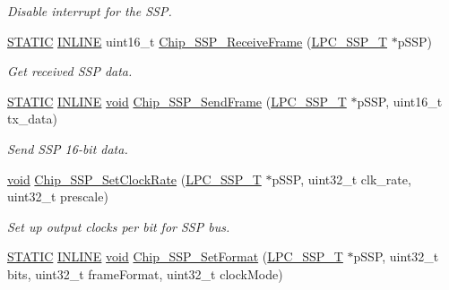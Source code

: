 \begin{DoxyCompactItemize}
\begin{DoxyCompactList}\small\item\em Disable interrupt for the S\-S\-P. \end{DoxyCompactList}\item 
\hyperlink{group__LPC__Types__Public__Macros_ga10b2d890d871e1489bb02b7e70d9bdfb}{S\-T\-A\-T\-I\-C} \hyperlink{group__LPC__Types__Public__Types_ga2eb6f9e0395b47b8d5e3eeae4fe0c116}{I\-N\-L\-I\-N\-E} uint16\-\_\-t \hyperlink{group__SSP__17XX__40XX_ga7da053acf90aff24ca59bdf673207aac}{Chip\-\_\-\-S\-S\-P\-\_\-\-Receive\-Frame} (\hyperlink{structLPC__SSP__T}{L\-P\-C\-\_\-\-S\-S\-P\-\_\-\-T} $\ast$p\-S\-S\-P)
\begin{DoxyCompactList}\small\item\em Get received S\-S\-P data. \end{DoxyCompactList}\item 
\hyperlink{group__LPC__Types__Public__Macros_ga10b2d890d871e1489bb02b7e70d9bdfb}{S\-T\-A\-T\-I\-C} \hyperlink{group__LPC__Types__Public__Types_ga2eb6f9e0395b47b8d5e3eeae4fe0c116}{I\-N\-L\-I\-N\-E} \hyperlink{Paradigm_2Tern__EE_2small_2portmacro_8h_a14d32f8130d3c0b212cfc751730b5b49}{void} \hyperlink{group__SSP__17XX__40XX_gab01849b80cad7f46924a04346560006c}{Chip\-\_\-\-S\-S\-P\-\_\-\-Send\-Frame} (\hyperlink{structLPC__SSP__T}{L\-P\-C\-\_\-\-S\-S\-P\-\_\-\-T} $\ast$p\-S\-S\-P, uint16\-\_\-t tx\-\_\-data)
\begin{DoxyCompactList}\small\item\em Send S\-S\-P 16-\/bit data. \end{DoxyCompactList}\item 
\hyperlink{Paradigm_2Tern__EE_2small_2portmacro_8h_a14d32f8130d3c0b212cfc751730b5b49}{void} \hyperlink{group__SSP__17XX__40XX_ga49832a18e0618a82afd66caa6f868445}{Chip\-\_\-\-S\-S\-P\-\_\-\-Set\-Clock\-Rate} (\hyperlink{structLPC__SSP__T}{L\-P\-C\-\_\-\-S\-S\-P\-\_\-\-T} $\ast$p\-S\-S\-P, uint32\-\_\-t clk\-\_\-rate, uint32\-\_\-t prescale)
\begin{DoxyCompactList}\small\item\em Set up output clocks per bit for S\-S\-P bus. \end{DoxyCompactList}\item 
\hyperlink{group__LPC__Types__Public__Macros_ga10b2d890d871e1489bb02b7e70d9bdfb}{S\-T\-A\-T\-I\-C} \hyperlink{group__LPC__Types__Public__Types_ga2eb6f9e0395b47b8d5e3eeae4fe0c116}{I\-N\-L\-I\-N\-E} \hyperlink{Paradigm_2Tern__EE_2small_2portmacro_8h_a14d32f8130d3c0b212cfc751730b5b49}{void} \hyperlink{group__SSP__17XX__40XX_ga381ba3a6b470b2c84468b88deed8ac18}{Chip\-\_\-\-S\-S\-P\-\_\-\-Set\-Format} (\hyperlink{structLPC__SSP__T}{L\-P\-C\-\_\-\-S\-S\-P\-\_\-\-T} $\ast$p\-S\-S\-P, uint32\-\_\-t bits, uint32\-\_\-t frame\-Format, uint32\-\_\-t clock\-Mode)

\end{DoxyCompactItemize}
